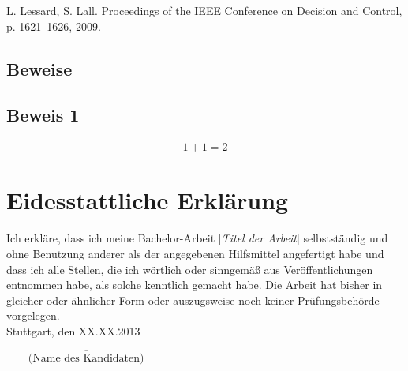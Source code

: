 \documentclass[12pt]{article}
\begin{document}
\newpage
\newpage{}
\setcounter{page}{5}

\begin{thebibliography}{99} 

 L. Lessard, S. Lall.
  Proceedings of the IEEE Conference on Decision and Control, p. 1621--1626, 2009.



\end{thebibliography}



\newpage\clearpage
{}
\begin{appendix}
\section{Beweise}
\subsection{Beweis 1}
\begin{eqnarray}
1+1 = 2
\end{eqnarray}
\end{appendix}



\newpage
\section*{Eidesstattliche Erklärung}
Ich erkläre, dass ich meine Bachelor-Arbeit [\emph{Titel der Arbeit}] selbstständig und ohne Benutzung anderer als der angegebenen Hilfsmittel angefertigt habe und dass ich alle Stellen, die ich wörtlich oder sinngemäß aus Veröffentlichungen entnommen habe, als solche kenntlich gemacht habe. Die Arbeit hat bisher in gleicher oder ähnlicher Form oder auszugsweise noch keiner Prüfungsbehörde vorgelegen. \\
\noindent Stuttgart, den XX.XX.2013
\begin{flushright}
$\overline{~~~~~~~~~\mbox{(Name des Kandidaten)}~~~~~~~~~}$
\end{flushright}
\end{document}
